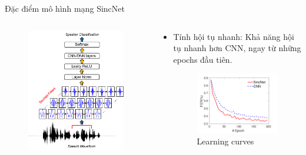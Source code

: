 \documentclass[notheorems, aspectratio=54]{beamer}
\begin{document}
\begin{frame}{Đặc điểm mô hình mạng SincNet}
	\begin{columns}
		\begin{column}{0.47\textwidth}
			\begin{figure}[H]
				\includegraphics[width=0.9\linewidth]{images/SincNet.png}
			\end{figure}
		\end{column}
		\begin{column}{0.5\textwidth}
		\begin{itemize}
			\item Tính hội tụ nhanh: Khả năng hội tụ nhanh hơn CNN, ngay từ những epochs đầu tiên.
			\begin{figure}[H]
				\includegraphics[width=0.9\linewidth]{images/fast_convergence.png}
				\caption{Learning curves}
			\end{figure}
		\end{itemize}
		\end{column}
	\end{columns}
\end{frame}
\end{document}
